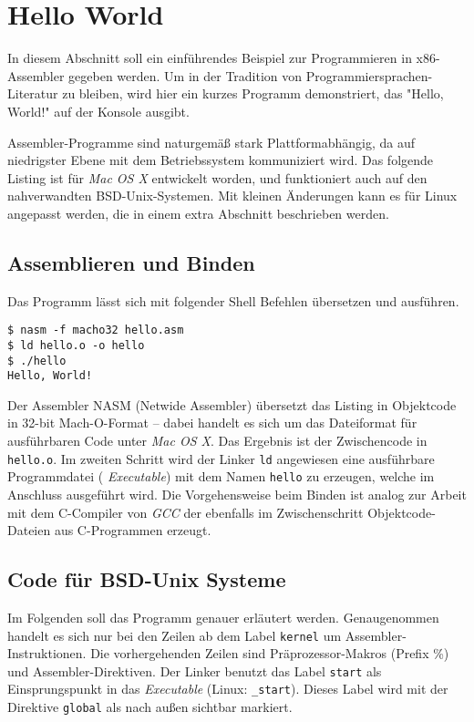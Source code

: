 \section{Hello World}

In diesem Abschnitt soll ein einführendes Beispiel zur Programmieren in x86-Assembler gegeben werden. Um in der Tradition von Programmiersprachen-Literatur zu bleiben, wird hier ein kurzes Programm demonstriert, das "Hello, World!" auf der Konsole ausgibt.

Assembler-Programme sind naturgemäß stark Plattformabhängig, da auf niedrigster Ebene mit dem Betriebssystem kommuniziert wird.
Das folgende Listing ist für \emph{Mac OS X} entwickelt worden, und 
funktioniert auch auf den nahverwandten BSD-Unix-Systemen. Mit kleinen Änderungen kann es für Linux angepasst werden, die in einem extra Abschnitt beschrieben werden.

\subsection{Assemblieren und Binden}

Das Programm lässt sich mit folgender Shell Befehlen übersetzen und ausführen.

\begin{lstlisting}[caption=Assemblieren und Binden von hello.asm]
$ nasm -f macho32 hello.asm
$ ld hello.o -o hello
$ ./hello
Hello, World!
\end{lstlisting}

Der Assembler NASM (Netwide Assembler) übersetzt das Listing in Objektcode in 32-bit Mach-O-Format – dabei handelt es sich um das Dateiformat für ausführbaren Code unter \emph{Mac OS X}. Das Ergebnis ist der Zwischencode in \texttt{hello.o}. Im zweiten Schritt wird der Linker \texttt{ld} angewiesen eine ausführbare Programmdatei (\emph{ Executable}) mit dem Namen \texttt{hello} zu erzeugen, welche im Anschluss ausgeführt wird. Die Vorgehensweise beim Binden ist analog zur Arbeit mit dem C-Compiler von \emph{GCC} der ebenfalls im Zwischenschritt Objektcode-Dateien aus C-Programmen erzeugt.

\subsection{Code für BSD-Unix Systeme}

Im Folgenden soll das Programm genauer erläutert werden. Genaugenommen handelt es sich nur bei den Zeilen ab dem Label \texttt{kernel} um Assembler-Instruktionen. Die vorhergehenden Zeilen sind Präprozessor-Makros (Prefix \%) und Assembler-Direktiven. Der Linker benutzt das Label {\tt start} als Einsprungspunkt in das \emph{Executable} (Linux: {\tt \_start}).
Dieses Label wird mit der Direktive {\tt global} als nach außen sichtbar markiert.

